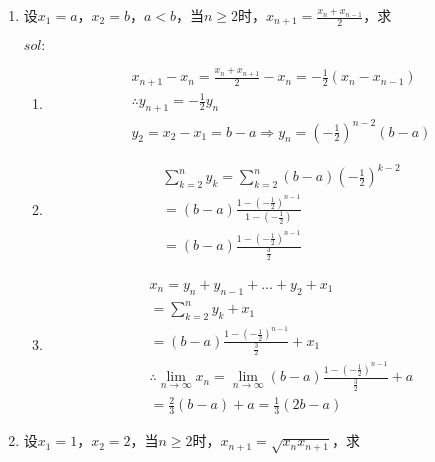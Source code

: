 \begin{enumerate}[{例}1.]
    \item 设$x_1=a$，$x_2=b$，$a<b$，当$n\geq 2$时，$x_{n+1}=\frac{x_n +x_{n-1}}{2}$，求
        $sol:$
        \begin{enumerate}[(1)]
            \item 
                \begin{align*}
                    &x_{n+1}-x_n=\frac{x_n+x_{n+1}}{2}-x_n=-\frac{1}{2}(x_n-x_{n-1})\\
                    &\therefore y_{n+1}=-\frac{1}{2}y_n\\
                    &y_2=x_2-x_1=b-a\Rightarrow y_n=(-\frac{1}{2})^{n-2}(b-a)
                \end{align*}
            \item
                \begin{align*}
                    &\sum_{k=2}^n y_k=\sum_{k=2}^n(b-a)(-\frac{1}{2})^{k-2}\\
                    &=(b-a)\frac{1-(-\frac{1}{2})^{n-1}}{1-(-\frac{1}{2})}\\
                    &=(b-a)\frac{1-(-\frac{1}{2})^{n-1}}{\frac{3}{2}}
                \end{align*}
            \item
                \begin{align*}
                    &x_n=y_n+y_{n-1}+\dots+y_2+x_1\\
                    &=\sum_{k=2}^ny_k+x_1\\
                    &=(b-a)\frac{1-(-\frac{1}{2})^{n-1}}{\frac{3}{2}}+x_1\\
                    &\therefore\lim_{n\to\infty}x_n=\lim_{n\to\infty}(b-a)\frac{1-(-\frac{1}{2})^{n-1}}{\frac{3}{2}}+a\\
                    &=\frac{2}{3}(b-a)+a=\frac{1}{3}(2b-a)
                \end{align*}
        \end{enumerate}
    \item 设$x_1=1$，$x_2=2$，当$n\geq 2$时，$x_{n+1}=\sqrt{x_n x_{n+1}}$，求
        \begin{compactenum}[(1)]

\end{compactenum}
\end{enumerate}
